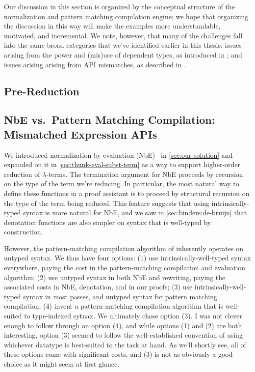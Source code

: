 Our discussion in this section is organized by the conceptual structure of the normalization and pattern matching compilation engine;
we hope that organizing the discussion in this way will make the examples more understandable, motivated, and incremental.
We note, however, that many of the challenges fall into the same broad categories that we've identified earlier in this thesis:
issues arising from the power and (mis)use of dependent types, as introduced in ;
and issues arising arising from API mismatches, as described in .

\subsection{Pre-Reduction} \label{sec:rewriting-more:pre-reduction}

\subsection{NbE vs.~Pattern Matching Compilation: Mismatched Expression APIs}
We introduced normalization by evaluation (NbE)~\cite{NbE} in \autoref{sec:our-solution} and expanded on it in \autoref{sec:thunk-eval-subst-term} as a way to support higher-order reduction of $\lambda$-terms.
The termination argument for NbE proceeds by recursion on the type of the term we're reducing.
In particular, the most natural way to define these functions in a proof assistant is to proceed by structural recursion on the type of the term being reduced.
This feature suggests that using intrinsically-typed syntax is more natural for NbE, and we saw in \autoref{sec:binders:de-bruijn} that denotation functions are also simpler on syntax that is well-typed by construction.

However, the pattern-matching compilation algorithm of \textcite{maranget2008compiling} inherently operates on untyped syntax.
We thus have four options:
(1) use intrinsically-well-typed syntax everywhere, paying the cost in the pattern-matching compilation and evaluation algorithm;
(2) use untyped syntax in both NbE and rewriting, paying the associated costs in NbE, denotation, and in our proofs;
(3) use intrinsically-well-typed syntax in most passes, and untyped syntax for pattern matching compilation;
(4) invent a pattern-matching compilation algorithm that is well-suited to type-indexed sytnax.
We ultimately chose option (3).
I was not clever enough to follow through on option (4), and while options (1) and (2) are both interesting, option (3) seemed to follow the well-established convention of using whichever datatype is best-suited to the task at hand.
As we'll shortly see, all of these options come with significant costs, and (3) is not as obviously a good choice as it might seem at first glance.

